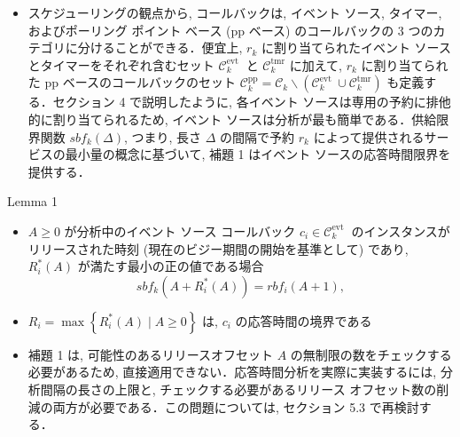 \begin{frame}{}
    \begin{itemize}
        \item スケジューリングの観点から, コールバックは, イベント ソース, タイマー, およびポーリング ポイント ベース (pp ベース) のコールバックの 3 つのカテゴリに分けることができる．便宜上, $r_{k}$ に割り当てられたイベント ソースとタイマーをそれぞれ含むセット $\mathcal{C}_{k}^{\text {evt }}$ と $\mathcal{C}_{k}^{\mathrm{tmr}}$ に加えて, $r_{k}$ に割り当てられた pp ベースのコールバックのセット $\mathcal{C}_{k}^{\mathrm{pp}}=\mathcal{C}_{k} \backslash\left(\mathcal{C}_{k}^{\text {evt }} \cup \mathcal{C}_{k}^{\mathrm{tmr}}\right)$ も定義する．セクション 4 で説明したように, 各イベント ソースは専用の予約に排他的に割り当てられるため, イベント ソースは分析が最も簡単である．供給限界関数 $s b f_{k}(\Delta)$, つまり, 長さ $\Delta$ の間隔で予約 $r_{k}$ によって提供されるサービスの最小量の概念に基づいて, 補題 1 はイベント ソースの応答時間限界を提供する．
    \end{itemize}
\end{frame}

\begin{frame}[label=lemma1]{Lemma 1}
    \begin{lemma}[]
        \begin{itemize}
            \item $A \geq 0$ が分析中のイベント ソース コールバック $c_{i} \in \mathcal{C}_{k}^{\text {evt }}$ のインスタンスがリリースされた時刻 (現在のビジー期間の開始を基準として) であり, $R_{i}^{*}(A)$ が満たす最小の正の値である場合
                  \begin{equation*}
                      s b f_{k}\left(A+R_{i}^{*}(A)\right)=r b f_{i}(A+1),
                  \end{equation*}

            \item $R_{i}=\max \left\{R_{i}^{*}(A) \mid A \geq 0\right\}$ は, $c_{i}$ の応答時間の境界である
        \end{itemize}
    \end{lemma}
\end{frame}

\begin{frame}{}
    \begin{itemize}
        \item 補題 1 は, 可能性のあるリリースオフセット $A$ の無制限の数をチェックする必要があるため, 直接適用できない．応答時間分析を実際に実装するには, 分析間隔の長さの上限と, チェックする必要があるリリース オフセット数の削減の両方が必要である．この問題については, セクション 5.3 で再検討する．
    \end{itemize}
\end{frame}

